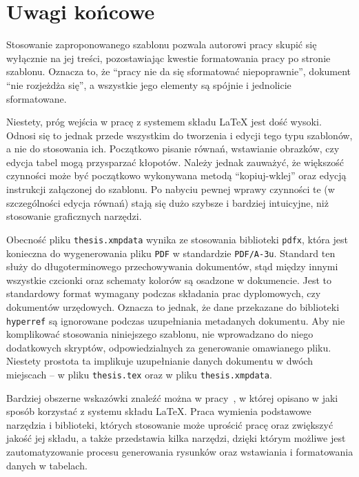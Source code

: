 \chapter{Uwagi końcowe}

Stosowanie zaproponowanego szablonu pozwala autorowi pracy skupić się wyłącznie na jej treści, pozostawiając kwestie formatowania pracy po stronie szablonu. Oznacza to, że \enquote{pracy nie da się sformatować niepoprawnie}, dokument \enquote{nie rozjeżdża się}, a wszystkie jego elementy są spójnie i jednolicie sformatowane.

Niestety, próg wejścia w pracę z systemem składu \LaTeX{} jest dość wysoki. Odnosi się to jednak przede wszystkim do tworzenia i edycji tego typu szablonów, a nie do stosowania ich. Początkowo pisanie równań, wstawianie obrazków, czy edycja tabel mogą przysparzać kłopotów. Należy jednak zauważyć, że większość czynności może być początkowo wykonywana metodą \enquote{kopiuj-wklej} oraz edycją instrukcji załączonej do szablonu. Po nabyciu pewnej wprawy czynności te (w szczególności edycja równań) stają się dużo szybsze i bardziej intuicyjne, niż stosowanie graficznych narzędzi.

Obecność pliku \texttt{thesis.xmpdata} wynika ze stosowania biblioteki \texttt{pdfx}, która jest konieczna do wygenerowania pliku \texttt{PDF} w standardzie \texttt{PDF/A-3u}. Standard ten służy do długoterminowego przechowywania dokumentów, stąd między innymi wszystkie czcionki oraz schematy kolorów są osadzone w dokumencie. Jest to standardowy format wymagany podczas składania prac dyplomowych, czy dokumentów urzędowych. Oznacza to jednak, że dane przekazane do biblioteki \texttt{hyperref} są ignorowane podczas uzupełniania metadanych dokumentu. Aby nie komplikować stosowania niniejszego szablonu, nie wprowadzano do niego dodatkowych skryptów, odpowiedzialnych za generowanie omawianego pliku. Niestety prostota ta implikuje uzupełnianie danych dokumentu w dwóch miejscach -- w pliku \texttt{thesis.tex} oraz w pliku \texttt{thesis.xmpdata}.

Bardziej obszerne wskazówki znaleźć można w pracy~\cite{ldrozdz_latex}, w której opisano w jaki sposób korzystać z systemu składu \LaTeX{}. Praca wymienia podstawowe narzędzia i biblioteki, których stosowanie może uprościć pracę oraz zwiększyć jakość jej składu, a także przedstawia kilka narzędzi, dzięki którym możliwe jest zautomatyzowanie procesu generowania rysunków oraz wstawiania i formatowania danych w tabelach.
